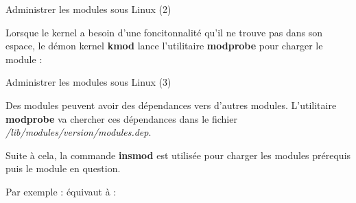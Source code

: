 \documentclass[12pt, t]{beamer}
\begin{document}
\begin{frame}{Administrer les modules sous Linux (2)}

    \vspace{15pt}
    Lorsque le kernel a besoin d'une foncitonnalité qu'il ne trouve pas dans son
    espace, le démon kernel {\textbf{kmod}} lance l'utilitaire {\textbf{modprobe}}
    pour charger le module :

    \vspace{10pt}
    \lstkmod

\end{frame}



\begin{frame}{Administrer les modules sous Linux (3)}

    \vspace{8pt}
    Des modules peuvent avoir des dépendances vers d'autres modules. L'utilitaire
    {\textbf{modprobe}} va chercher ces dépendances dans le fichier
    {\textit{/lib/modules/version/modules.dep}}.

    {
        \vspace{8pt}
        Suite à cela, la commande {\textbf{insmod}} est utilisée pour charger les
        modules prérequis puis le module en question.
    }

    {
        \vspace{8pt}
        Par exemple :
        \vspace{4pt}
        \lstdep
        équivaut à :
        \vspace{4pt}
        \lstdepbis
    }

\end{frame}
\end{document}
